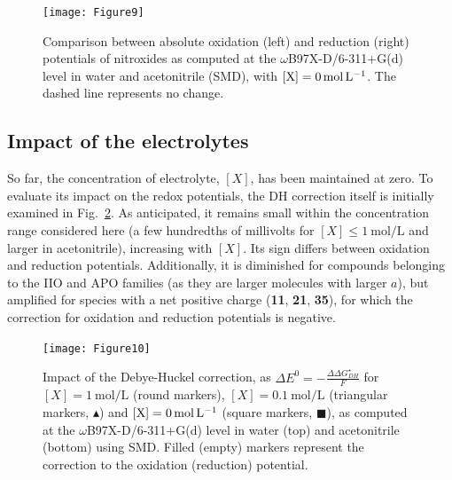 \documentclass[review]{elsarticle}
\begin{document}
\begin{figure}[!h]
	\centering
	\texttt{[image: Figure9]}
	\caption{Comparison between absolute oxidation (left) and reduction (right) potentials of nitroxides as computed at the $\omega$B97X-D/6-311+G(d) level in water and acetonitrile (SMD), with $[\ce{X}]=\SI{0}{\mole\per\liter}$. The dashed line represents no change. }
	\label{fig:watvsac}
\end{figure}

\subsection{Impact of the electrolytes}

So far, the concentration of electrolyte, $[X]$, has been maintained at zero. To evaluate its impact on the redox potentials, the DH correction itself is initially examined in Fig.~\ref{fig:DH}. As anticipated, it remains small within the concentration range considered here (a few hundredths of millivolts for $[X] \leq \SI{1}{\mole\per\liter}$ and larger in acetonitrile), increasing with $[X]$. Its sign differs between oxidation and reduction potentials. Additionally, it is diminished for compounds belonging to the IIO and APO families (as they are larger molecules with larger $a$), but amplified for species with a net positive charge (\textbf{11}, \textbf{21}, \textbf{35}), for which the correction for oxidation and reduction potentials is negative.


\begin{figure}[!h]
	\centering
	\texttt{[image: Figure10]}
	\caption{Impact of the Debye-Huckel correction, as $\Delta E^0 = -\frac{\Delta \Delta G_{DH}^\star}{F}$ for $[X]=\SI{1}{\mole\per\liter}$ (round markers), $[X]=\SI{0.1}{\mole\per\liter}$ (triangular markers, $\blacktriangle$)  and $[\ce{X}]=\SI{0}{\mole\per\liter}$ (square markers, $\blacksquare$), as computed at the $\omega$B97X-D/6-311+G(d) level in water (top) and acetonitrile (bottom) using SMD. Filled (empty) markers represent the correction to the oxidation (reduction) potential. }
	\label{fig:DH}
\end{figure}
\end{document}
